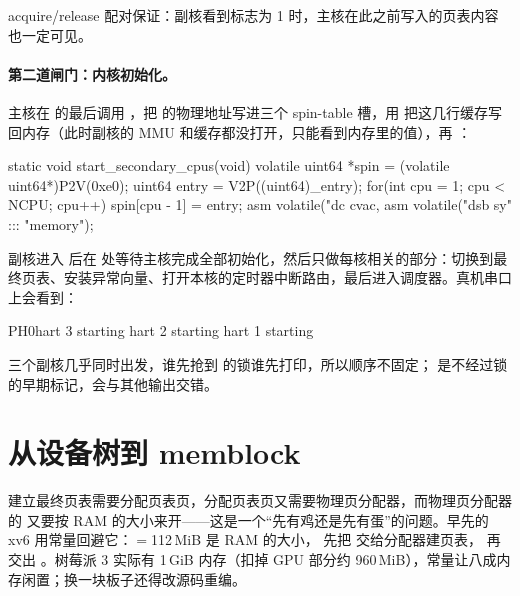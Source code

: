 
acquire/release 配对保证：副核看到标志为 1 时，主核在此之前写入的页表内容也一定可见。

\paragraph{第二道闸门：内核初始化。} 主核在  的最后调用 ，把  的物理地址写进三个 spin-table 槽，用  把这几行缓存写回内存（此时副核的 MMU 和缓存都没打开，只能看到内存里的值），再 ：

\begin{ccode}
static void start_secondary_cpus(void) {
  volatile uint64 *spin = (volatile uint64*)P2V(0xe0);
  uint64 entry = V2P((uint64)_entry);
  for(int cpu = 1; cpu < NCPU; cpu++){
    spin[cpu - 1] = entry;
    asm volatile("dc cvac, %
  }
  asm volatile("dsb sy\n\tsev" ::: "memory");
}
\end{ccode}

副核进入  后在  处等待主核完成全部初始化，然后只做每核相关的部分：切换到最终页表、安装异常向量、打开本核的定时器中断路由，最后进入调度器。真机串口上会看到：

\begin{txtcode}
PH0hart 3 starting
hart 2 starting
hart 1 starting
\end{txtcode}

三个副核几乎同时出发，谁先抢到  的锁谁先打印，所以顺序不固定； 是不经过锁的早期标记，会与其他输出交错。

\section{从设备树到 memblock}
\label{sec:memblock}

建立最终页表需要分配页表页，分配页表页又需要物理页分配器，而物理页分配器的  又要按 RAM 的大小来开——这是一个“先有鸡还是先有蛋”的问题。早先的 xv6 用常量回避它：$=$112\,MiB 是 RAM 的大小， 先把 \code{[end, EARLYTOP)} 交给分配器建页表， 再交出 \code{[EARLYTOP, PHYSTOP)}。树莓派 3 实际有 1\,GiB 内存（扣掉 GPU 部分约 960\,MiB），常量让八成内存闲置；换一块板子还得改源码重编。

